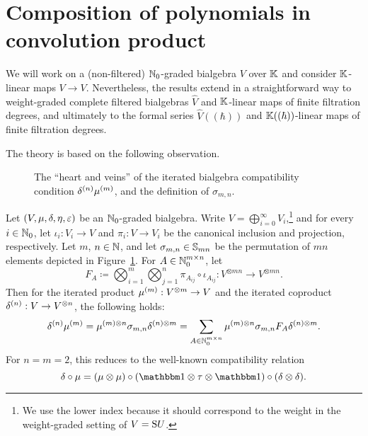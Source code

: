 \documentclass[\MainFolder/Text.tex]{subfiles}
\begin{document}
\section{Composition of polynomials in convolution product}\label{Sec:CompConvA}
\renewcommand{\Star}{*}
We will work on a (non-filtered) $\mathbb{N}_0$-graded bialgebra $V$ over $\mathbb{K}$ and consider $\mathbb{K}$-linear maps $V\rightarrow V$. Nevertheless, the results extend in a straightforward way to weight-graded complete filtered bialgebras $\hat{V}$ and $\mathbb{K}$-linear maps of finite filtration degrees, and ultimately to the formal series $\hat{V}((\hbar))$ and $\mathbb{K}((\hbar))$-linear maps of finite filtration degrees.

The theory is based on the following observation.
\begin{figure}[t]
\centering

\caption[The ``heart'' of the iterated bialgebra compatibility condition.]{The ``heart and veins'' of the iterated bialgebra compatibility condition $\delta^{(n)}\mu^{(m)}$, and the definition of $\sigma_{m,n}$.}
\label{Fig:Spider}
\end{figure}
\begin{Lemma}\label{Lem:ItCompCond}
Let $(V, \mu, \delta, \eta, \varepsilon)$ be an $\mathbb{N}_0$-graded bialgebra. Write $V = \bigoplus_{i=0}^\infty V_i$,\footnote{We use the lower index because it should correspond to the weight in the weight-graded setting of $V = \mathrm{S} U$.} and for every $i\in \mathbb{N}_0$, let $\iota_i : V_i \rightarrow V$ and $\pi_i: V \rightarrow V_i$ be the canonical inclusion and projection, respectively. Let $m$, $n\in \mathbb{N}$, and let $\sigma_{m,n}\in \mathbb{S}_{m n}$ be the permutation of $mn$ elements depicted in Figure~\ref{Fig:Spider}. For $A\in \mathbb{N}_0^{m\times n}$, let
\[ F_{A}\coloneqq \bigotimes_{i=1}^m \bigotimes_{j=1}^n \pi_{A_{ij}}\circ \iota_{A_{ij}} : V^{\otimes m n } \longrightarrow V^{\otimes m n}. \]
Then for the iterated product $\mu^{(m)}: V^{\otimes m} \rightarrow V$ and the iterated coproduct $\delta^{(n)}: V\rightarrow V^{\otimes n}$, the following holds:
\begin{equation}\label{Eq:ItCompRel}
\delta^{(n)}\mu^{(m)} = \mu^{(m)\otimes n} \sigma_{m,n} \delta^{(n)\otimes m} =  \sum_{A\in \mathbb{N}_0^{m\times n}} \mu^{(m)\otimes n} \sigma_{m,n}F_A \delta^{(n)\otimes m}.
\end{equation}
For $n=m=2$, this reduces to the well-known compatibility relation
\begin{equation}\label{Eq:BasicCompCond}
\MVCoProd\circ \MVProd = (\MVProd\otimes\MVProd)\circ (\Id\otimes\tau\otimes\Id)\circ(\MVCoProd\otimes\MVCoProd).
\end{equation}
\end{Lemma}
\end{document}
